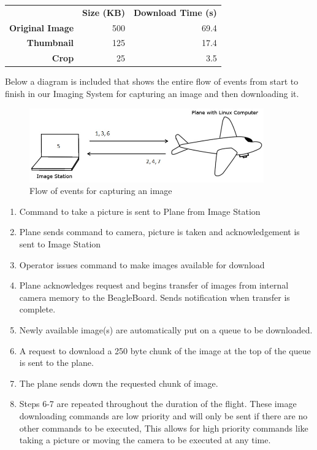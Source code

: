 \documentclass[10pt]{report}
\begin{document}
\begin{tabular}{rrr}
 & {\bf Size (KB)} & {\bf Download Time (s)} \\
 {\bf Original Image} &        500 &       69.4 \\
 {\bf Thumbnail} &        125 &       17.4 \\
 {\bf Crop} &         25 &        3.5 \\
\end{tabular}

Below a diagram is included that shows the entire flow of events from start to finish in our Imaging System for capturing an image and then downloading it.

\begin{figure} [H]
  \centering
  	\includegraphics[width=0.9\textwidth]{../images/CaptureProcess.jpg}
  	\caption[Image Capture Process]{Flow of events for capturing an image}
  	\label{fig:imagecaptureprocess}
\end{figure}

\begin{enumerate}
\item Command to take a picture is sent to Plane from Image Station
\item Plane sends command to camera, picture is taken and acknowledgement is sent to Image Station
\item Operator issues command to make images available for download
\item Plane acknowledges request and begins transfer of images from internal camera memory to the BeagleBoard.  Sends notification when transfer is complete.
\item Newly available image(s) are automatically put on a queue to be downloaded.
\item A request to download a 250 byte chunk of the image at the top of the queue is sent to the plane.
\item The plane sends down the requested chunk of image.
\item Steps 6-7 are repeated throughout the duration of the flight.  These image downloading commands are low priority and will only be sent if there are no other commands to be executed, This allows for high priority commands like taking a picture or moving the camera to be executed at any time.
\end{enumerate}
\end{document}
